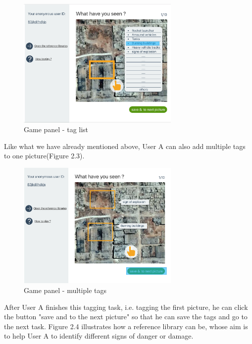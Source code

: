       \begin{figure}[htp]
      \centering
      \includegraphics[width=0.7\textwidth]{figures/function-player-1}
      \caption{Game panel - tag list}
      \label{fig:main-panel}
      \end{figure}

      Like what we have already mentioned above,
      User A can also add multiple tags to one picture(Figure 2.3).

      \begin{figure}[htp]
      \centering
      \includegraphics[width=0.7\textwidth]{figures/function-player-2}
      \caption{Game panel - multiple tags}
      \label{fig:main-panel}
      \end{figure}

      After User A finishes this tagging task,
      i.e.
      tagging the first picture,
      he can click the button "save and to the next picture" so that he can save the tags and go to the next task.
      Figure 2.4 illustrates how a reference library can be,
      whose aim is to help User A to identify different signs of danger or damage.

